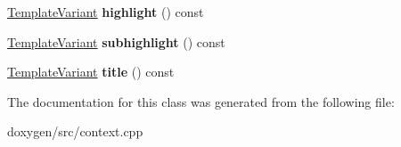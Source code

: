 \begin{DoxyCompactItemize}
\mbox{\hyperlink{class_template_variant}{Template\+Variant}} {\bfseries highlight} () const
\item 
\mbox{\label{class_namespace_members_index_context_1_1_private_af9f012940bc72708c15a6a7ca6cc9b59}} 
\mbox{\hyperlink{class_template_variant}{Template\+Variant}} {\bfseries subhighlight} () const
\item 
\mbox{\label{class_namespace_members_index_context_1_1_private_a460da6084279d162f929caeb4a0e7b5e}} 
\mbox{\hyperlink{class_template_variant}{Template\+Variant}} {\bfseries title} () const
\end{DoxyCompactItemize}


The documentation for this class was generated from the following file\+:\begin{DoxyCompactItemize}
\item 
doxygen/src/context.\+cpp\end{DoxyCompactItemize}
